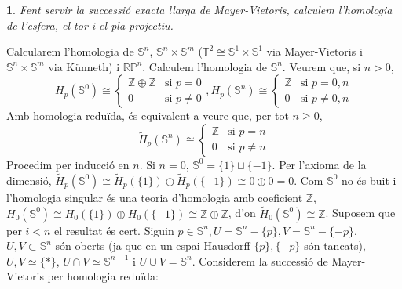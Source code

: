 \documentclass[compress,10pt]{article}
\newtheorem{enunciat}{}
\theoremstyle{definition}
\begin{document}
\pagestyle{fancy}
\begin{enunciat}
    Fent servir la successió exacta llarga de Mayer-Vietoris, calculem l'homologia de l'esfera, el tor i el pla projectiu.
\end{enunciat}
Calcularem l'homologia de $\mathbb{S}^{n}$, $\mathbb{S}^{n}\times\mathbb{S}^{m}$ ($\mathbb{T}^{2}\cong\mathbb{S}^{1}\times\mathbb{S}^{1}$ via Mayer-Vietoris i $\mathbb{S}^{n}\times\mathbb{S}^{m}$ via Künneth) i $\mathbb{R}\mathbb{P}^{n}$.\newline
Calculem l'homologia de $\mathbb{S}^{n}$. Veurem que, si $n>0$,
\begin{equation*}
    H_{p}(\mathbb{S}^{0})\cong\begin{cases}
        \mathbb{Z}\oplus\mathbb{Z}&\textrm{si $p=0$}\\
        0&\textrm{si $p\neq0$}
    \end{cases},
    H_{p}(\mathbb{S}^{n})\cong\begin{cases}
        \mathbb{Z}&\textrm{si $p=0,n$}\\
        0&\textrm{si $p\neq0,n$}
    \end{cases}
\end{equation*}
Amb homologia reduïda, és equivalent a veure que, per tot $n\geq0$,
\begin{equation*}
    \widetilde{H}_{p}(\mathbb{S}^{n})\cong\begin{cases}
        \mathbb{Z}&\textrm{si $p=n$}\\
        0&\textrm{si $p\neq n$}
    \end{cases}
\end{equation*}
Procedim per inducció en $n$. Si $n=0$, $\mathbb{S}^{0}=\{1\}\sqcup\{-1\}$. Per l'axioma de la dimensió, $\widetilde{H}_{p}(\mathbb{S}^{0})\cong\widetilde{H}_{p}(\{1\})\oplus\widetilde{H}_{p}(\{-1\})\cong0\oplus0=0$. Com $\mathbb{S}^{0}$ no és buit i l'homologia singular és una teoria d'homologia amb coeficient $\mathbb{Z}$, $H_{0}(\mathbb{S}^{0})\cong H_{0}(\{1\})\oplus H_{0}(\{-1\})\cong\mathbb{Z}\oplus\mathbb{Z}$, d'on $\widetilde{H}_{0}(\mathbb{S}^{0})\cong\mathbb{Z}$.\newline
Suposem que per $i<n$ el resultat és cert. Siguin $p\in\mathbb{S}^{n},U=\mathbb{S}^{n}-\{p\},V=\mathbb{S}^{n}-\{-p\}$. $U,V\subset\mathbb{S}^{n}$ són oberts (ja que en un espai Hausdorff $\{p\},\{-p\}$ són tancats), $U,V\simeq\{*\}$, $U\cap V\simeq\mathbb{S}^{n-1}$ i $U\cup V=\mathbb{S}^{n}$. Considerem la successió de Mayer-Vietoris per homologia reduïda:
\end{document}
